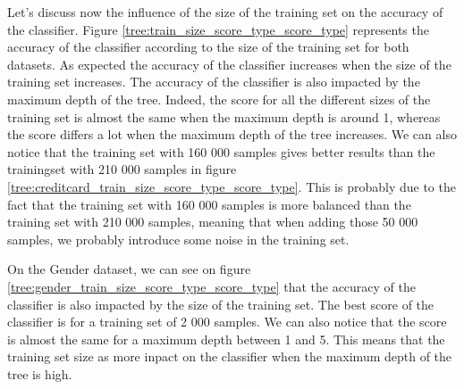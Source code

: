 \documentclass[10pt]{article}
\begin{document}
		Let's discuss now the influence of the size of the training set on the accuracy of the classifier. Figure \ref{tree:train_size_score_type_score_type} represents the accuracy of the classifier according to the size of the training set for both datasets. As expected the accuracy of the classifier increases when the size of the training set increases. The accuracy of the classifier is also impacted by the maximum depth of the tree. Indeed, the score for all the different sizes of the training set is almost the same when the maximum depth is around 1, whereas the score differs a lot when the maximum depth of the tree increases. We can also notice that the training set with 160 000 samples gives better results than the trainingset with 210 000 samples in figure \ref{tree:creditcard_train_size_score_type_score_type}. This is probably due to the fact that the training set with 160 000 samples is more balanced than the training set with 210 000 samples, meaning that when adding those 50 000 samples, we probably introduce some noise in the training set.

		On the Gender dataset, we can see on figure \ref{tree:gender_train_size_score_type_score_type} that the accuracy of the classifier is also impacted by the size of the training set. The best score of the classifier is for a training set of 2 000 samples. We can also notice that the score is almost the same for a maximum depth between 1 and 5. This means that the training set size as more inpact on the classifier when the maximum depth of the tree is high.
\end{document}
